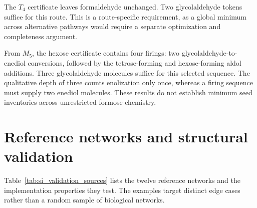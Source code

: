 \documentclass[pdflatex,referee]{../template/sn-jnl}
\theoremstyle{plain}%
\theoremstyle{definition}%
\theoremstyle{remark}%
\begin{document}
The $T_4$ certificate leaves formaldehyde unchanged. Two glycolaldehyde tokens suffice for this route. This is a route-specific requirement, as a global minimum across alternative pathways would require a separate optimization and completeness argument.

From $M_5$, the hexose certificate contains four firings: two glycolaldehyde-to-enediol conversions, followed by the tetrose-forming and hexose-forming aldol additions. Three glycolaldehyde molecules suffice for this selected sequence. The qualitative depth of three counts enolization only once, whereas a firing sequence must supply two enediol molecules. These results do not establish minimum seed inventories across unrestricted formose chemistry.

\section{Reference networks and structural validation}
\label{si:validation}

Table~\ref{tab:si_validation_sources} lists the twelve reference networks and the implementation properties they test. The examples target distinct edge cases rather than a random sample of biological networks.
\end{document}
